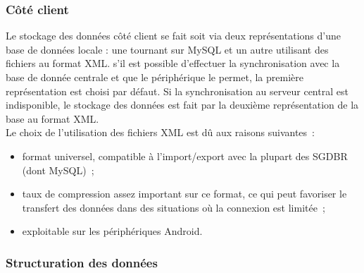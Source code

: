 \subsubsection{Côté client}
Le stockage des données côté client se fait soit via deux représentations d'une base de données locale : une tournant sur MySQL et un autre utilisant des fichiers au format XML. s'il est possible d'effectuer la synchronisation avec la base de donnée centrale et que le périphérique le permet, la première représentation est choisi par défaut. Si la synchronisation au serveur central est indisponible, le stockage des données est fait par la deuxième représentation de la base au format XML. \\
Le choix de l'utilisation des fichiers XML est dû aux raisons suivantes~:
\begin{itemize}
	\item format universel, compatible à l'import/export avec la plupart des SGDBR (dont MySQL)~;
	\item taux de compression assez important sur ce format, ce qui peut favoriser le transfert des données dans des situations où la connexion est limitée~;
	\item exploitable sur les périphériques Android.
\end{itemize}

\subsubsection{Structuration des données}

